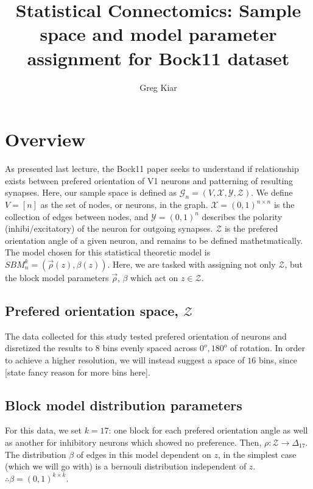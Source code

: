 \documentclass[12pt]{article}
\title{Statistical Connectomics: Sample space and model parameter assignment for Bock11 dataset}
\author{Greg Kiar}
\begin{document}
\setlength{\voffset}{-0.5in}
\setlength{\headsep}{5pt}
\maketitle
\vspace{-1cm}
\section*{Overview}
As presented last lecture, the Bock11 paper seeks to understand if relationship exists between prefered orientation of V1 neurons and patterning of resulting synapses. Here, our sample space is defined as $\mathscr{G} _n= (V, \mathscr{X}, \mathscr{Y}, \mathscr{Z})$. We define $V=[n]$ as the set of nodes, or neurons, in the graph. $\mathscr{X} = (0, 1)^{n\times n}$ is the collection of edges between nodes, and $\mathscr{Y} = (0,1)^{n}$ describes the polarity (inhibi/excitatory) of the neuron for outgoing synapses. $\mathscr{Z}$ is the prefered orientation angle of a given neuron, and remains to be defined mathetmatically. The model chosen for this statistical theoretic model is $SBM_n^k = (\vec{\rho}(z), \beta(z))$. Here, we are tasked with assigning not only $\mathscr{Z}$, but the block model parameters $\vec{\rho}$, $\beta$ which act on $z \in \mathscr{Z}$.

\subsection*{Prefered orientation space, $\mathscr{Z}$}
The data collected for this study tested prefered orientation of neurons and disretized the results to $8$ bins evenly spaced across ${0^o, 180^o}$ of rotation. In order to achieve a higher resolution, we will instead suggest a space of $16$ bins, since [state fancy reason for more bins here].

\subsection*{Block model distribution parameters}
For this data, we set $k=17$: one block for each prefered orientation angle as well as another for inhibitory neurons which showed no preference. Then, $\rho: \mathscr{Z} \to \Delta_{17}$. The distribution $\beta$ of edges in this model dependent on $z$, in the simplest case (which we will go with) is a bernouli distribution independent of $z$. $\therefore \beta = (0,1)^{k \times k}$.
\end{document}

